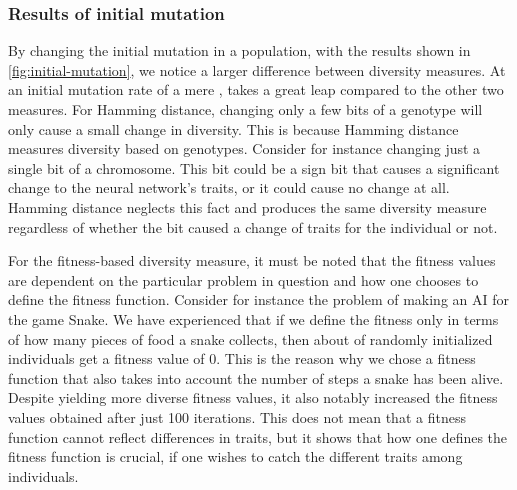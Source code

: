 \subsubsection{Results of initial mutation} By changing the initial mutation in a population, with the results shown in \cref{fig:initial-mutation}, we notice a larger difference between diversity measures. At an initial mutation rate of a mere , \dia{} takes a great leap compared to the other two measures. For Hamming distance, changing only a few bits of a genotype will only cause a small change in diversity. This is because Hamming distance measures diversity based on genotypes. Consider for instance changing just a single bit of a chromosome. This bit could be a sign bit that causes a significant change to the neural network's traits, or it could cause no change at all. Hamming distance neglects this fact and produces the same diversity measure regardless of whether the bit caused a change of traits for the individual or not.

For the fitness-based diversity measure, it must be noted that the fitness values are dependent on the particular problem in question and how one chooses to define the fitness function. Consider for instance the problem of making an AI for the game Snake. We have experienced that if we define the fitness only in terms of how many pieces of food a snake collects, then about  of randomly initialized individuals get a fitness value of 0. This is the reason why we chose a fitness function that also takes into account the number of steps a snake has been alive. Despite yielding more diverse fitness values, it also notably increased the fitness values obtained after just 100 iterations. This does not mean that a fitness function cannot reflect differences in traits, but it shows that how one defines the fitness function is crucial, if one wishes to catch the different traits among individuals.
%

